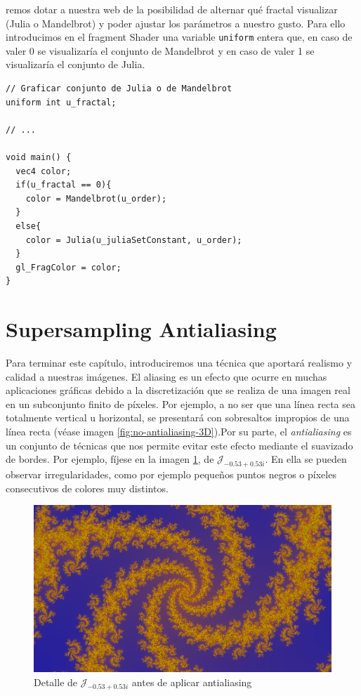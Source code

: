 remos dotar a nuestra web de la posibilidad de alternar qué fractal visualizar (Julia o Mandelbrot) y poder ajustar los parámetros a nuestro gusto. Para ello introducimos en el fragment Shader una variable \verb|uniform| entera que, en caso de valer 0 se visualizaría el conjunto de Mandelbrot y en caso de valer 1 se visualizaría el conjunto de Julia.

\begin{lstlisting}
// Graficar conjunto de Julia o de Mandelbrot
uniform int u_fractal;

// ... 

void main() {
  vec4 color;
  if(u_fractal == 0){
    color = Mandelbrot(u_order);
  }
  else{
    color = Julia(u_juliaSetConstant, u_order);
  }
  gl_FragColor = color;
}
\end{lstlisting}

\section{Supersampling Antialiasing}
\label{section:SSAA-2D}

Para terminar este capítulo, introduciremos una técnica que aportará realismo y calidad a nuestras imágenes. El aliasing es un efecto que ocurre en muchas aplicaciones gráficas debido a la discretización que se realiza de una imagen real en un subconjunto finito de píxeles. Por ejemplo, a no ser que una línea recta sea totalmente vertical u horizontal, se presentará con sobresaltos impropios de una línea recta (véase imagen \ref{fig:no-antialiasing-3D}).Por su parte, el \textit{antialiasing} es un conjunto de técnicas que nos permite evitar este efecto mediante el suavizado de bordes. Por ejemplo, fíjese en la imagen \ref{fig:no-antialiasing-2D}, de $\mathcal{J}_{-0.53 + 0.53i}$. En ella se pueden observar irregularidades, como por ejemplo pequeños puntos negros o píxeles consecutivos de colores muy distintos.

\begin{figure} [ht]
  \centering
  \includegraphics[width=130mm]{img/C7/no-antialiasing.png}
  \caption{Detalle de $\mathcal{J}_{-0.53 + 0.53i}$ antes de aplicar antialiasing}
  \label{fig:no-antialiasing-2D}
\end{figure}

